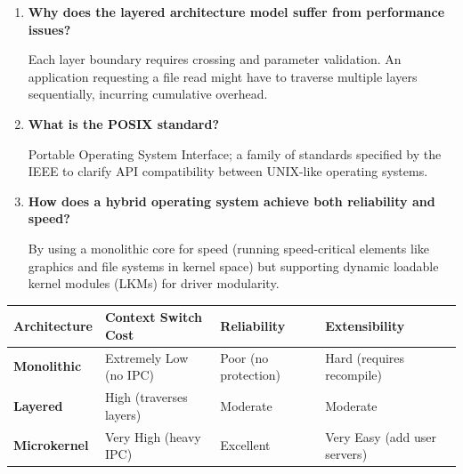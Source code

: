\documentclass[12pt,a4paper]{article}
\newcommand{\Q}[1]{\textbf{#1}\par\noindent\ignorespaces}
\renewcommand{\arraystretch}{1.45}
\begin{document}
\begin{tcolorbox}[exambox, title={\textbf{Frequently Asked / Viva Questions}}]
\begin{enumerate}[topsep=0pt, label=\textbf{Q\arabic*.}, itemsep=5pt]
  \item \Q{Why does the layered architecture model suffer from performance issues?}
    Each layer boundary requires crossing and parameter validation. An application requesting a file read might have to traverse multiple layers sequentially, incurring cumulative overhead.
  \item \Q{What is the POSIX standard?}
    Portable Operating System Interface; a family of standards specified by the IEEE to clarify API compatibility between UNIX-like operating systems.
  \item \Q{How does a hybrid operating system achieve both reliability and speed?}
    By using a monolithic core for speed (running speed-critical elements like graphics and file systems in kernel space) but supporting dynamic loadable kernel modules (LKMs) for driver modularity.
\end{enumerate}
\end{tcolorbox}

\begin{tcolorbox}[tikzbox, title={Comparison of OS Architectures}]
\renewcommand{\arraystretch}{1.4}
\par\noindent
\begin{tabularx}{\linewidth}{|B{2.2cm}|>{\small\centering\arraybackslash}X|>{\small\centering\arraybackslash}X|>{\small\centering\arraybackslash}X|}
\hline
\textbf{Architecture} & \textbf{\color{myred}Context Switch Cost} & \textbf{\color{myteal}Reliability} & \textbf{\color{myamber}Extensibility} \\
\hline
\textbf{Monolithic} & Extremely Low (no IPC) & Poor (no protection) & Hard (requires recompile) \\
\hline
\textbf{Layered} & High (traverses layers) & Moderate & Moderate \\
\hline
\textbf{Microkernel} & Very High (heavy IPC) & Excellent & Very Easy (add user servers) \\
\hline
\end{tabularx}
\end{tcolorbox}
\end{document}
